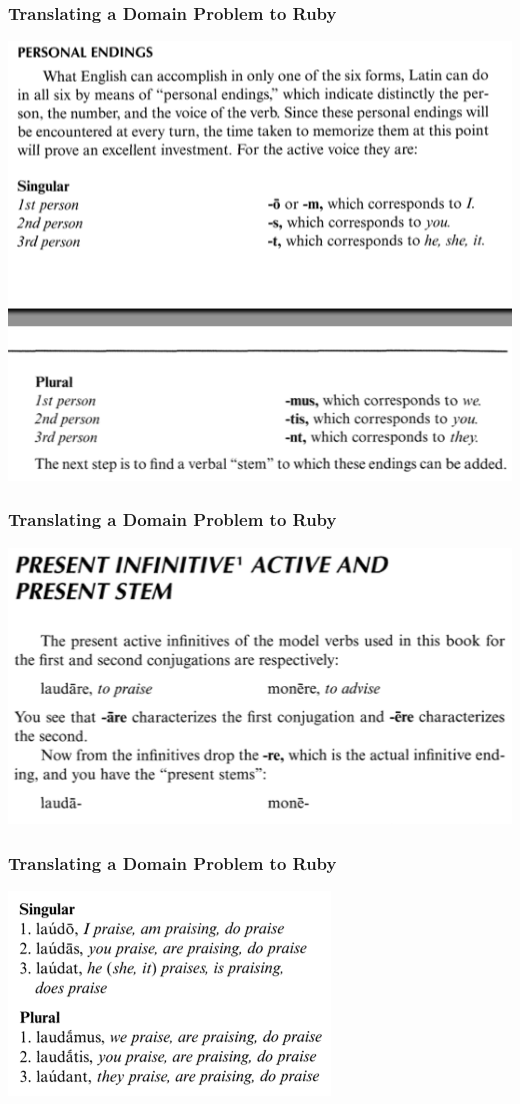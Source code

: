 \documentclass[slidestop,compress,mathserif]{beamer}
\begin{document}
\begin{frame}
	\frametitle{Translating a Domain Problem to Ruby} 
	\includegraphics[scale=0.45]{img/conj_how_1.png}
\end{frame}

\begin{frame}
	\frametitle{Translating a Domain Problem to Ruby} 
	\includegraphics[scale=0.45]{img/conj_how_2.png}
\end{frame}

\begin{frame}
	\frametitle{Translating a Domain Problem to Ruby} 
	\includegraphics[scale=0.45]{img/conj_how_3.png}	
\end{frame}
\end{document}
